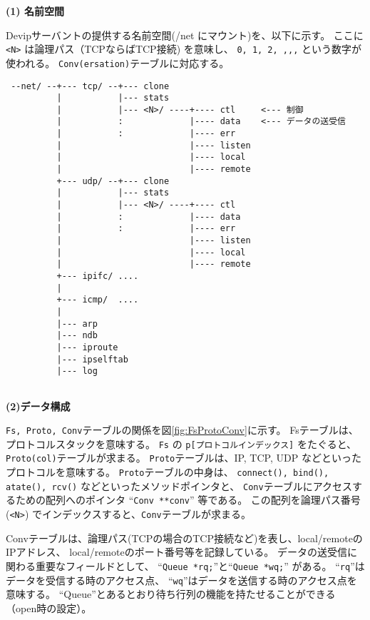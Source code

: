 {\bf \flushleft(1) 名前空間}

   Devipサーバントの提供する名前空間(/net にマウント)を、以下に示す。
ここに \verb|<N>| は論理パス（TCPならばTCP接続) を意味し、
\verb|0, 1, 2, ,,,| という数字が使われる。 
{\tt Conv(ersation)}テーブルに対応する。

{\small
\begin{verbatim}
 --net/ --+--- tcp/ --+--- clone
          |           |--- stats
          |           |--- <N>/ ----+---- ctl     <--- 制御
          |           :             |---- data    <--- データの送受信
          |           :             |---- err
          |                         |---- listen
          |                         |---- local
          |                         |---- remote  
          +--- udp/ --+--- clone  
          |           |--- stats    
          |           |--- <N>/ ----+---- ctl  
          |           :             |---- data 
          |           :             |---- err 
          |                         |---- listen  
          |                         |---- local 
          |                         |---- remote 
          +--- ipifc/ ....
          |
          +--- icmp/  ....
          |
          |--- arp
          |--- ndb
          |--- iproute
          |--- ipselftab
          |--- log    
                      
\end{verbatim}
}

{\bf \flushleft(2)データ構成}

{\tt Fs, Proto, Conv}テーブルの関係を図\ref{fig:FsProtoConv}に示す。
Fsテーブルは、プロトコルスタックを意味する。
{\tt Fs} の {\tt p[プロトコルインデックス]} をたぐると、
{\tt Proto(col)}テーブルが求まる。
{\tt Proto}テーブルは、IP, TCP, UDP などといったプロトコルを意味する。
{\tt Proto}テーブルの中身は、
{\tt connect(), bind(), atate(), rcv()} などといったメソッドポインタと、
{\tt Conv}テーブルにアクセスするための配列へのポインタ ``\verb|Conv **conv|'' 等である。
この配列を論理パス番号 (\verb|<N>|) でインデックスすると、{\tt Conv}テーブルが求まる。

Convテーブルは、論理パス(TCPの場合のTCP接続など)を表し、local/remoteのIPアドレス、
local/remoteのポート番号等を記録している。
データの送受信に関わる重要なフィールドとして、
``\verb|Queue *rq;|''と``\verb|Queue *wq;|'' がある。
``{\tt rq}''はデータを受信する時のアクセス点、
``{\tt wq}''はデータを送信する時のアクセス点を意味する。
``Queue''とあるとおり待ち行列の機能を持たせることができる（open時の設定）。


